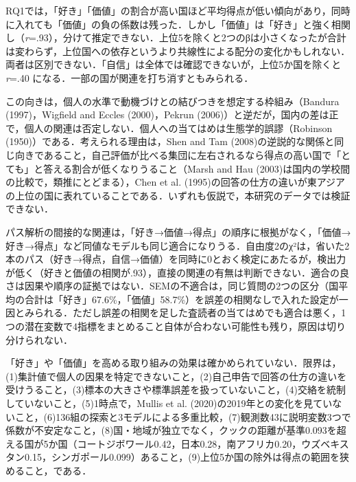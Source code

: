 \documentclass[a4paper,10pt,twocolumn]{ltjsarticle}
\makeatletter
\renewcommand{\section}{\@startsection{section}{1}{\z@}{1.1\Cvs \@plus.4\Cdp \@minus.2\Cdp}{.5\Cvs \@plus.2\Cdp}{\normalfont\gtfamily\bfseries\large}}
\makeatother
\begin{document}
\section{考察}
RQ1では，「好き」「価値」の割合が高い国ほど平均得点が低い傾向があり，同時に入れても「価値」の負の係数は残った．しかし「価値」は「好き」と強く相関し（\textit{r}=.93），分けて推定できない．上位5を除くと2つのβは小さくなったが合計は変わらず，上位国への依存というより共線性による配分の変化かもしれない．両者は区別できない．「自信」は全体では確認できないが，上位5か国を除くと \textit{r}=.40 になる．一部の国が関連を打ち消すともみられる．

この向きは，個人の水準で動機づけとの結びつきを想定する枠組み（Bandura (1997)，Wigfield and Eccles (2000)，Pekrun (2006)）と逆だが，国内の差は正で，個人の関連は否定しない．個人への当てはめは生態学的誤謬（Robinson (1950)）である．考えられる理由は，Shen and Tam (2008)の逆説的な関係と同じ向きであること，自己評価が比べる集団に左右されるなら得点の高い国で「とても」と答える割合が低くなりうること（Marsh and Hau (2003)は国内の学校間の比較で，類推にとどまる），Chen et al. (1995)の回答の仕方の違いが東アジアの上位の国に表れていることである．いずれも仮説で，本研究のデータでは検証できない．

パス解析の間接的な関連は，「好き→価値→得点」の順序に根拠がなく，「価値→好き→得点」など同値なモデルも同じ適合になりうる．自由度2のχ²は，省いた2本のパス（好き→得点，自信→価値）を同時に0とおく検定にあたるが，検出力が低く（好きと価値の相関が.93），直接の関連の有無は判断できない．適合の良さは因果や順序の証拠ではない．SEMの不適合は，同じ質問の2つの区分（国平均の合計は「好き」67.6\%，「価値」58.7\%）を誤差の相関なしで入れた設定が一因とみられる．ただし誤差の相関を足した査読者の当てはめでも適合は悪く，1つの潜在変数で4指標をまとめること自体が合わない可能性も残り，原因は切り分けられない．

「好き」や「価値」を高める取り組みの効果は確かめられていない．限界は，(1)集計値で個人の因果を特定できないこと，(2)自己申告で回答の仕方の違いを受けうること，(3)標本の大きさや標準誤差を扱っていないこと，(4)交絡を統制していないこと，(5)1時点で，Mullis et al. (2020)の2019年との変化を見ていないこと，(6)136組の探索と3モデルによる多重比較，(7)観測数43に説明変数3つで係数が不安定なこと，(8)国・地域が独立でなく，クックの距離が基準0.093を超える国が5か国（コートジボワール0.42，日本0.28，南アフリカ0.20，ウズベキスタン0.15，シンガポール0.099）あること，(9)上位5か国の除外は得点の範囲を狭めること，である．
\end{document}
